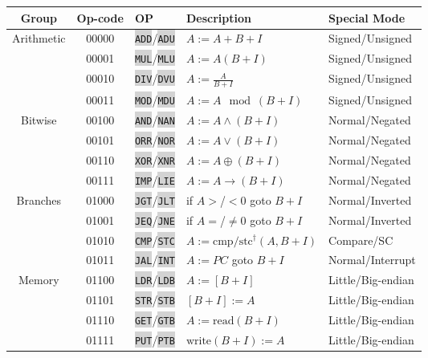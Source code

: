 \documentclass{article}
\newcommand{\labcode}[1]{\colorbox{lightgray}{\lstinline[language=lab]{#1}}}
\begin{document}
\begin{table}[h!]
\centering
\begin{tabular}{cclll}
    \toprule Group & Op-code & OP & Description & Special Mode \\ \midrule
    Arithmetic  & 00000 & \labcode{ADD}/\labcode{ADU} & $A := A + B + I$ & Signed/Unsigned \\
                & 00001 & \labcode{MUL}/\labcode{MLU} & $A := A(B + I)$ & Signed/Unsigned \\
                & 00010 & \labcode{DIV}/\labcode{DVU} & $A := \frac{A}{B + I}$ & Signed/Unsigned \\
                & 00011 & \labcode{MOD}/\labcode{MDU} & $A := A \mod (B + I)$ & Signed/Unsigned \\ \midrule
    Bitwise     & 00100 & \labcode{AND}/\labcode{NAN} & $A := A \land (B + I)$ & Normal/Negated \\
                & 00101 & \labcode{ORR}/\labcode{NOR} & $A := A \lor (B + I)$ & Normal/Negated \\
                & 00110 & \labcode{XOR}/\labcode{XNR} & $A := A \oplus (B + I)$ & Normal/Negated \\
                & 00111 & \labcode{IMP}/\labcode{LIE} & $A := A \rightarrow (B + I)$ & Normal/Negated \\ \midrule
    Branches    & 01000 & \labcode{JGT}/\labcode{JLT} & if $A >$/$< 0$ goto $B + I$ & Normal/Inverted \\
                & 01001 & \labcode{JEQ}/\labcode{JNE} & if $A =$/$\ne 0$ goto $B + I$ & Normal/Inverted \\
                & 01010 & \labcode{CMP}/\labcode{STC} & $A := \mbox{cmp}/\mbox{stc}^\dagger(A,B+I)$ & Compare/SC \\
                & 01011 & \labcode{JAL}/\labcode{INT} & $A := PC$ goto $B + I$ & Normal/Interrupt \\ \midrule
    Memory      & 01100 & \labcode{LDR}/\labcode{LDB} & $A := [B + I]$ & Little/Big-endian \\
                & 01101 & \labcode{STR}/\labcode{STB} & $[B + I] := A$ & Little/Big-endian \\
                & 01110 & \labcode{GET}/\labcode{GTB} & $A := \mbox{read}(B + I)$ & Little/Big-endian \\
                & 01111 & \labcode{PUT}/\labcode{PTB} & $\mbox{write}(B + I) := A$ & Little/Big-endian \\ \midrule

\end{tabular}
\end{table}
\end{document}
